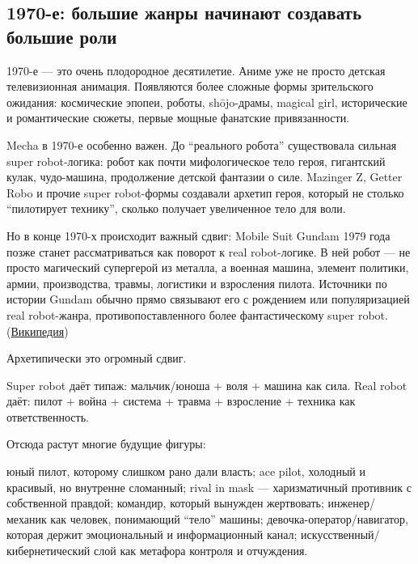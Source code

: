 \subsection*{1970-е: большие жанры начинают создавать большие роли}

1970-е --- это очень плодородное десятилетие. Аниме уже не просто
детская телевизионная анимация. Появляются более сложные формы
зрительского ожидания: космические эпопеи, роботы, shōjo-драмы, magical
girl, исторические и романтические сюжеты, первые мощные фанатские
привязанности.

Mecha в 1970-е особенно важен. До ``реального робота'' существовала
сильная super robot-логика: робот как почти мифологическое тело героя,
гигантский кулак, чудо-машина, продолжение детской фантазии о силе.
Mazinger Z, Getter Robo и прочие super robot-формы создавали архетип
героя, который не столько ``пилотирует технику'', сколько получает
увеличенное тело для воли.

Но в конце 1970-х происходит важный сдвиг: Mobile Suit Gundam 1979 года
позже станет рассматриваться как поворот к real robot-логике. В ней
робот --- не просто магический супергерой из металла, а военная машина,
элемент политики, армии, производства, травмы, логистики и взросления
пилота. Источники по истории Gundam обычно прямо связывают его с
рождением или популяризацией real robot-жанра, противопоставленного
более фантастическому super robot.
(\href{https://en.wikipedia.org/wiki/Mobile_Suit_Gundam?utm_source=chatgpt.com}{Википедия})

Архетипически это огромный сдвиг.

Super robot даёт типаж: мальчик/\hspace{0pt}юноша + воля + машина как сила. Real
robot даёт: пилот + война + система + травма + взросление + техника как
ответственность.

Отсюда растут многие будущие фигуры:

юный пилот, которому слишком рано дали власть; ace pilot, холодный и
красивый, но внутренне сломанный; rival in mask --- харизматичный
противник с собственной правдой; командир, который вынужден жертвовать;
инженер/\hspace{0pt}механик как человек, понимающий ``тело'' машины;
девочка-оператор/\hspace{0pt}навигатор, которая держит эмоциональный и
информационный канал; искусственный/\hspace{0pt}кибернетический слой как метафора
контроля и отчуждения.

